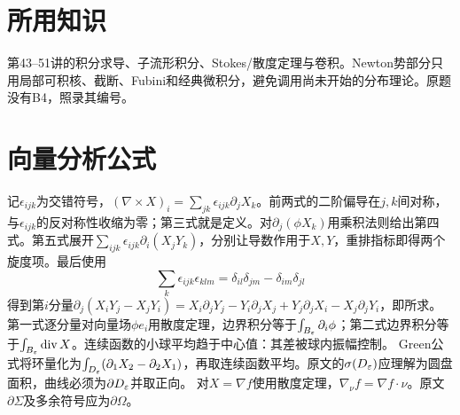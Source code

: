 \documentclass[UTF8,fontset=fandol,11pt]{ctexart}
\begin{document}
\section*{所用知识}
第43--51讲的积分求导、子流形积分、Stokes/散度定理与卷积。Newton势部分只用局部可积核、截断、Fubini和经典微积分，避免调用尚未开始的分布理论。原题没有B4，照录其编号。
\section{向量分析公式}
记$\epsilon_{ijk}$为交错符号，$(\nabla\times X)_i=\sum_{jk}\epsilon_{ijk}\partial_jX_k$。前两式的二阶偏导在$j,k$间对称，与$\epsilon_{ijk}$的反对称性收缩为零；第三式就是定义。对$\partial_j(\phi X_k)$用乘积法则给出第四式。第五式展开$\sum_{ijk}\epsilon_{ijk}\partial_i(X_jY_k)$，分别让导数作用于$X,Y$，重排指标即得两个旋度项。最后使用
\[\sum_k\epsilon_{ijk}\epsilon_{klm}=\delta_{il}\delta_{jm}-\delta_{im}\delta_{jl}\]
得到第$i$分量$\partial_j(X_iY_j-X_jY_i)=X_i\partial_jY_j-Y_i\partial_jX_j+Y_j\partial_jX_i-X_j\partial_jY_i$，即所求。
第一式逐分量对向量场$\phi e_i$用散度定理，边界积分等于$\int_{B_\varepsilon}\partial_i\phi$；第二式边界积分等于$\int_{B_\varepsilon}\operatorname{div}X$。连续函数的小球平均趋于中心值：其差被球内振幅控制。
Green公式将环量化为$\int_{D_\varepsilon}(\partial_1X_2-\partial_2X_1)$，再取连续函数平均。原文的$\sigma(D_\varepsilon)$应理解为圆盘面积，曲线必须为$\partial D_\varepsilon$并取正向。
对$X=\nabla f$使用散度定理，$\nabla_\nu f=\nabla f\cdot\nu$。原文$\partial\Sigma$及多余符号应为$\partial\Omega$。
\end{document}
